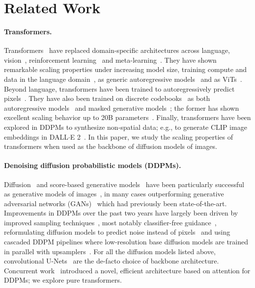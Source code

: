 \documentclass[10pt,twocolumn,letterpaper]{article}
\begin{document}
\section{Related Work}



\paragraph{Transformers.} Transformers~\cite{Vaswani2017} have replaced domain-specific architectures across language, vision~\cite{Dosovitskiy2020}, reinforcement learning~\cite{chen2021decision,janner2021trajectory} and meta-learning~\cite{Peebles2022}. They have shown remarkable scaling properties under increasing model size, training compute and data in the language domain~\cite{kaplan2020scaling}, as generic autoregressive models~\cite{henighan2020scaling} and as ViTs~\cite{zhai2022scaling}. Beyond language, transformers have been trained to autoregressively predict pixels~\cite{parmar2018image,child2019generating,Chen2020generative}. They have also been trained on discrete codebooks~\cite{van2017neural} as both autoregressive models~\cite{esser2020taming,ramesh2021zero} and masked generative models~\cite{chang2022maskgit,gu2022vector}; the former has shown excellent scaling behavior up to 20B parameters~\cite{yu2022scaling}. Finally, transformers have been explored in DDPMs to synthesize non-spatial data; e.g., to generate CLIP image embeddings in DALL$\cdot$E 2~\cite{ramesh2022hierarchical,radford2021}. In this paper, we study the scaling properties of transformers when used as the backbone of diffusion models of images.

\paragraph{Denoising diffusion probabilistic models (DDPMs).}
Diffusion~\cite{sohl2015thermodynamics,ho2020ddpm} and score-based generative models~\cite{hyvarinen2005estimation,song2019generative} have been particularly successful as generative models of images~\cite{nichol2021glide,ramesh2022hierarchical,imagen2022,rombach2021highresolution}, in many cases outperforming generative adversarial networks (GANs)~\cite{goodfellow2014generative} which had previously been state-of-the-art. Improvements in DDPMs over the past two years have largely been driven by improved sampling techniques~\cite{ho2020ddpm,song2020denoising,Karras2022edm}, most notably classifier-free guidance~\cite{ho2021classifier}, reformulating diffusion models to predict noise instead of pixels~\cite{ho2020ddpm} and using cascaded DDPM pipelines where low-resolution base diffusion models are trained in parallel with upsamplers~\cite{ho2021cascaded,dhariwal2021adm}. For all the diffusion models listed above, convolutional U-Nets~\cite{ronneberger2015u} are the de-facto choice of backbone architecture. Concurrent work~\cite{jabri2022scalable} introduced a novel, efficient architecture based on attention for DDPMs; we explore pure transformers.
\end{document}

